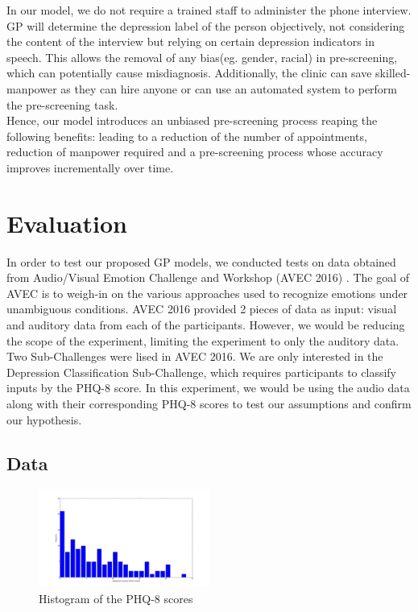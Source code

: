 \documentclass{article}
\begin{document}
	In our model, we do not require a trained staff to administer the phone interview. 
	GP will determine the depression label of the person objectively, not considering the content of the interview but relying on certain depression indicators in speech\cite{nimh2015}. 
	This allows the removal of any bias(eg. gender, racial) in pre-screening, which can potentially cause misdiagnosis. 
	Additionally, the clinic can save skilled-manpower as they can hire anyone or can use an automated system to perform the pre-screening task. \\
	
	Hence, our model introduces an unbiased pre-screening process reaping the following benefits: leading to a reduction of the number of appointments, reduction of manpower required and a pre-screening process whose accuracy improves incrementally over time.

	\section{Evaluation}
	In order to test our proposed GP models, we conducted tests on data obtained from Audio/Visual Emotion Challenge and Workshop (AVEC 2016) \cite{avec2016}. 
	The goal of AVEC is to weigh-in on the various approaches used to recognize emotions under unambiguous conditions. 
	AVEC 2016 provided 2 pieces of data as input: visual and auditory data from each of the participants. 
	However, we would be reducing the scope of the experiment, limiting the experiment to only the auditory data. 
	Two Sub-Challenges were lised in AVEC 2016. 
	We are only interested in the Depression Classification Sub-Challenge, which requires participants to classify inputs by the PHQ-8 score. 
	In this experiment, we would be using the audio data along with their corresponding PHQ-8 scores to test our assumptions and confirm our hypothesis.

	\subsection{Data}
	\begin{figure}[h]
	\center
 	\includegraphics[width=0.5\textwidth]{histogram_phq8}
	\caption{Histogram of the PHQ-8 scores}
	\label{histogram_phq8}
	\end{figure}
	
\end{document}
